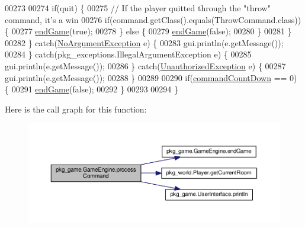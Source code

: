 \begin{DoxyCode}
00273 
00274             \textcolor{keywordflow}{if}(quit) \{
00275                 \textcolor{comment}{// If the player quitted through the "throw" command, it's a win}
00276                 \textcolor{keywordflow}{if}(command.getClass().equals(ThrowCommand.class)) \{
00277                     \hyperlink{classpkg__game_1_1GameEngine_a6d7340637e1eb46994a494c149442a22}{endGame}(\textcolor{keyword}{true});
00278                 \} \textcolor{keywordflow}{else} \{
00279                     \hyperlink{classpkg__game_1_1GameEngine_a6d7340637e1eb46994a494c149442a22}{endGame}(\textcolor{keyword}{false});
00280                 \}
00281             \}
00282         \} \textcolor{keywordflow}{catch}(\hyperlink{classpkg__exceptions_1_1NoArgumentException}{NoArgumentException} e) \{
00283             gui.println(e.getMessage());
00284         \} \textcolor{keywordflow}{catch}(pkg\_exceptions.IllegalArgumentException e) \{
00285             gui.println(e.getMessage());
00286         \} \textcolor{keywordflow}{catch}(\hyperlink{classpkg__exceptions_1_1UnauthorizedException}{UnauthorizedException} e) \{
00287             gui.println(e.getMessage());
00288         \}
00289 
00290         \textcolor{keywordflow}{if}(\hyperlink{classpkg__game_1_1GameEngine_af4ea44f51563b4e2c0a67fe918bf5e3c}{commandCountDown} == 0) \{
00291             \hyperlink{classpkg__game_1_1GameEngine_a6d7340637e1eb46994a494c149442a22}{endGame}(\textcolor{keyword}{false});
00292         \}
00293 
00294     \}
\end{DoxyCode}


Here is the call graph for this function\-:\nopagebreak
\begin{figure}[H]
\begin{center}
\leavevmode
\includegraphics[width=350pt]{classpkg__game_1_1GameEngine_a37887ae202eadba82495da82ac4e1908_cgraph}
\end{center}
\end{figure}


